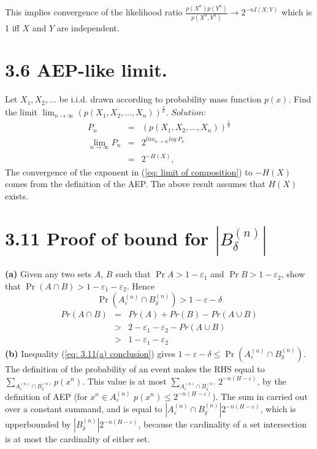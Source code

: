 \documentclass[10pt]{article}
\newcommand{\pref}[1]{{(\ref{#1})}}
\begin{document}
\begin{tiny}
\begin{multicols}{3}
This implies convergence of the likelihood ratio
$\frac{p(X^n)p(Y^n)}{p(X^n,Y^n)} \rightarrow 2^{-nI(X;Y)}$ which is 1 iff
$X$ and $Y$ are independent.
\section*{3.6 AEP-like limit.}
Let $X_1,X_2,\dots$ be i.i.d. drawn according to probability mass function
$p(x)$. Find the limit $\lim_{n \to \infty}
(p(X_1,X_2,\dots,X_n))^{\frac{1}{n}}$.
$Solution$:
\begin{eqnarray}
    P_n &=& (p(X_1,X_2,\dots,X_n))^{\frac{1}{n}}
        \label{eq: defn P_n} \\
    \lim_{n\to \infty} P_n &=& 2^{lim_{n\to\infty}log\ P_n}
        \label{eq: limit of composition} \\
    &=& 2^{-H(X)},
        \label{eq: P_n limit} 
    \end{eqnarray} 
    The convergence of the exponent in \pref{eq: limit of composition} to
    $-H(X)$ comes from the definition of the AEP.
    The above result assumes that $H(X)$ exists.
    \section*{3.11 Proof of bound for $|B_\delta^{(n)}|$}
\textbf{(a)}
Given any two sets $A$, $B$ such that $\Pr{A} > 1-\varepsilon_1$ and
$\Pr{B} > 1-\varepsilon_2$, show that $\Pr(A\cap B) > 1 - \varepsilon_1 -
\varepsilon_2$. Hence
\begin{equation}
    \Pr(A_\varepsilon^{(n)} \cap B_\delta^{(n)}) > 1 - \varepsilon - \delta
    \label{eq: 3.11(a) conclusion}
\end{equation}
\proof
\begin{eqnarray}
    Pr(A\cap B) &=& Pr(A) + Pr(B) - Pr(A\cup B)
    \label{eq: pr A intersect B} \\
    &>& 2 - \varepsilon_1 - \varepsilon_2 - Pr(A\cup B)
    \label{eq: sub hypotheses} \\
    &>& 1 - \varepsilon_1 - \varepsilon_2
    \label{eq: 3.11a}
\end{eqnarray}
\textbf{(b)} 
Inequality \pref{eq: 3.11(a) conclusion} gives $1-\varepsilon-\delta \leq \Pr(A_\varepsilon^{(n)} \cap B_\delta^{(n)})$. 
The definition of the probability of an event makes the RHS equal to
$\sum_{A_\varepsilon^{(n)} \cap B_\delta^{(n)}} p(x^n)$.
This value is at most 
$\sum_{A_\varepsilon^{(n)} \cap B_\delta^{(n)}} 2^{-n(H-\varepsilon)}$, 
by the definition of AEP 
(for $x^n \in A_\varepsilon^{(n)}$ $p(x^n) \leq 2^{-n(H - \varepsilon)}$).
The sum in carried out over a constant summand, and is equal to
$|A_\varepsilon^{(n)} \cap B_\delta^{(n)}|2^{-n(H-\varepsilon)}$, which is
upperbounded by $|B_\delta^{(n)}|2^{-n(H-\varepsilon)}$, because the
cardinality of a set intersection is at most the cardinality of either
set.



\end{multicols}
\end{tiny}
\end{document}
